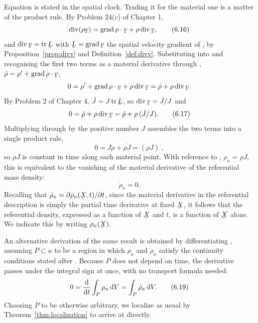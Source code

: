 Equation  is stated in the spatial clock. Trading it for the
material one is a matter of the product rule. By Problem 24(c) of
Chapter 1,
\begin{equation}
   \dvg(\rho\bv)=\ip{\grad\rho}\bv+\rho\dvg\bv ,
   \tag{6.16}\label{eq:6.16}
\end{equation}
and $\dvg\bv=\tr\bL$ with $\bL=\grad\bv$ the spatial velocity gradient
of , by Proposition~\ref{prop:divv} and
Definition~\ref{def:divv}. Substituting  into  and
recognising the first two terms as a material derivative through
, $\dot\rho=\rho'+\ip{\grad\rho}\bv$,
\[
   0=\rho'+\ip{\grad\rho}\bv+\rho\dvg\bv=\dot\rho+\rho\dvg\bv .
\]
By Problem 2 of Chapter 4, $\dot J=J\tr\bL$, so $\dvg\bv=\dot J/J$ and
\begin{equation}
   0=\dot\rho+\rho\dvg\bv=\dot\rho+\rho\,(\dot J/J).
   \tag{6.17}\label{eq:6.17}
\end{equation}
Multiplying  through by the positive number $J$ assembles the
two terms into a single product rule,
\[
   0=J\dot\rho+\rho\dot J=(\rho J)^{\textstyle\cdot},
\]
so $\rho J$ is constant in time along each material point. With
reference to , $\rho_{\kappa}=\rho J$, this is equivalent to
the vanishing of the material derivative of the referential mass
density:
\begin{equation}
   \dot\rho_{\kappa}=0 .
   \tag{6.18}\label{eq:6.18}
\end{equation}
Recalling that $\dot\rho_{\kappa}=\partial\rho_{\kappa}(\bX,t)/
\partial t$, since the material derivative in the referential
description is simply the partial time derivative at fixed $\bX$, it
follows that the referential density, expressed as a function of $\bX$
and $t$, is a function of $\bX$ alone. We indicate this by writing
$\rho_{\kappa}(\bX)$.

An alternative derivation of the same result is obtained by
differentiating , assuming $P\subset\kappa$ to be a region in
which $\rho_{\kappa}$ and $\dot\rho_{\kappa}$ satisfy the continuity
conditions stated after . Because $P$ does not depend on
time, the derivative passes under the integral sign at once, with no
transport formula needed:
\begin{equation}
   0=\frac{\mathrm{d}}{\mathrm{d} t}\int_{P}\rho_{\kappa}\,\mathrm{d} V
    =\int_{P}\dot\rho_{\kappa}\,\mathrm{d} V .
   \tag{6.19}\label{eq:6.19}
\end{equation}
Choosing $P$ to be otherwise arbitrary, we localize as usual by
Theorem~\ref{thm:localization} to arrive at  directly.

